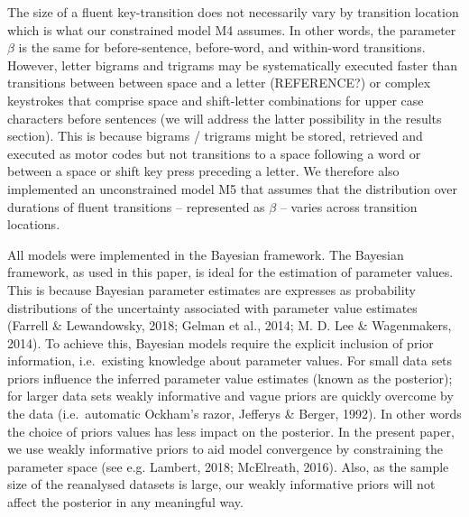 \documentclass[
  english,
  man,floatsintext]{apa7}
\begin{document}
The size of a fluent key-transition does not necessarily vary by transition location which is what our constrained model M4 assumes. In other words, the parameter \(\beta\) is the same for before-sentence, before-word, and within-word transitions. However, letter bigrams and trigrams may be systematically executed faster than transitions between between space and a letter (REFERENCE?) or complex keystrokes that comprise space and shift-letter combinations for upper case characters before sentences (we will address the latter possibility in the results section). This is because bigrams / trigrams might be stored, retrieved and executed as motor codes but not transitions to a space following a word or between a space or shift key press preceding a letter. We therefore also implemented an unconstrained model M5 that assumes that the distribution over durations of fluent transitions -- represented as \(\beta\) -- varies across transition locations.

All models were implemented in the Bayesian framework. The Bayesian framework, as used in this paper, is ideal for the estimation of parameter values. This is because Bayesian parameter estimates are expresses as probability distributions of the uncertainty associated with parameter value estimates (Farrell \& Lewandowsky, 2018; Gelman et al., 2014; M. D. Lee \& Wagenmakers, 2014). To achieve this, Bayesian models require the explicit inclusion of prior information, i.e.~existing knowledge about parameter values. For small data sets priors influence the inferred parameter value estimates (known as the posterior); for larger data sets weakly informative and vague priors are quickly overcome by the data (i.e.~automatic Ockham's razor, Jefferys \& Berger, 1992). In other words the choice of priors values has less impact on the posterior. In the present paper, we use weakly informative priors to aid model convergence by constraining the parameter space (see e.g. Lambert, 2018; McElreath, 2016). Also, as the sample size of the reanalysed datasets is large, our weakly informative priors will not affect the posterior in any meaningful way.
\end{document}
